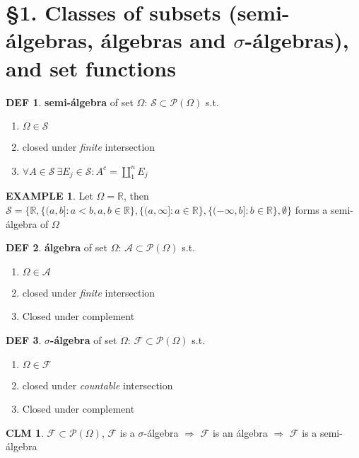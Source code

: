 \documentclass[hidelinks]{article}
\theoremstyle{definition}
\newtheorem*{defin}{DEF}
\newtheorem*{eg}{EXAMPLE}
\theoremstyle{dotless}
\newtheorem{claim}{CLM}[section]
\theoremstyle{remark}
\begin{document}
\newpage
\section*{\S1. Classes of subsets (semi-álgebras, álgebras and $\sigma$-álgebras), and set functions}
\setcounter{section}{1}

\begin{defin}
\textbf{semi-álgebra} of set $\Omega$: $\mathscr{S}\subset\mathscr{P}(\Omega)$ s.t.
\begin{enumerate}[label=\arabic*\degree]
    \item $\Omega\in\mathscr{S}$
    \item closed under \emph{finite} intersection
    \item $\forall A\in\mathscr{S}\ \exists E_j\in\mathscr{S}:A^c=\coprod\limits_1^nE_j$
\end{enumerate}
\end{defin}

\begin{eg}
Let $\Omega=\mathbb{R}$, then $\mathscr{S}=\{\mathbb{R},\{(a,b]:a<b,a,b\in \mathbb{R}\},\{(a,\infty]:a\in \mathbb{R}\},\{(-\infty,b]:b\in\mathbb{R}\},\emptyset\}$ forms a semi-álgebra of $\Omega$
\end{eg}

\begin{defin}
\textbf{álgebra} of set $\Omega$:
$\mathscr{A}\subset\mathscr{P}(\Omega)$ s.t.
\begin{enumerate}[label=\arabic*\degree]
    \item $\Omega\in\mathscr{A}$
    \item closed under \emph{finite} intersection
    \item Closed under complement
\end{enumerate}
\end{defin}

\begin{defin}
\textbf{$\sigma$-álgebra} of set $\Omega$:
$\mathscr{F}\subset\mathscr{P}(\Omega)$ s.t.
\begin{enumerate}[label=\arabic*\degree]
    \item $\Omega\in\mathscr{F}$
    \item closed under \emph{countable} intersection
    \item Closed under complement
\end{enumerate}
\end{defin}

\begin{claim}
$\mathscr{F}\subset\mathscr{P}(\Omega)$, $\mathscr{F}$ is a $\sigma$-álgebra $\Rightarrow$ $\mathscr{F}$ is an álgebra $\Rightarrow$ $\mathscr{F}$ is a semi-álgebra
\end{claim}
\end{document}
